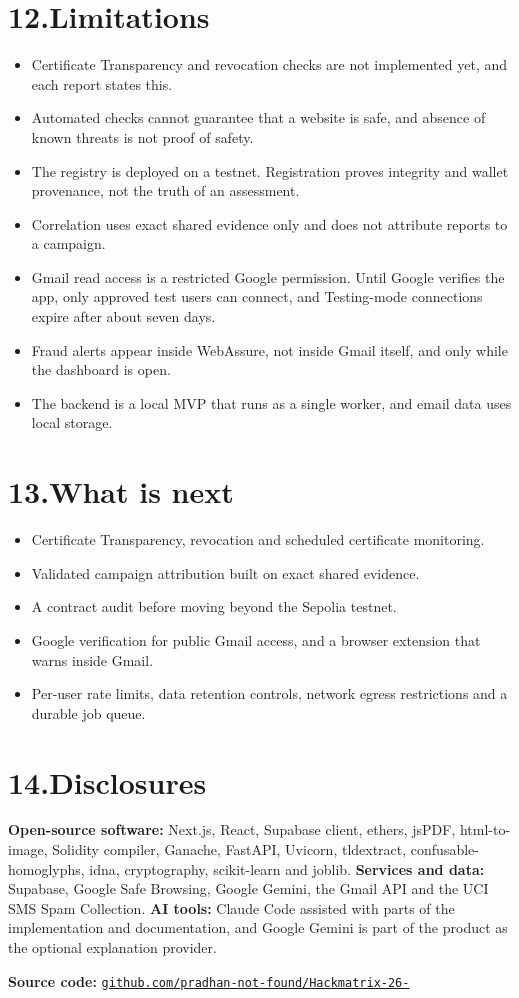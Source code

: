\documentclass[11pt,a4paper]{article}
\begin{document}
\section{12.\quad Limitations}
\begin{itemize}
\item Certificate Transparency and revocation checks are not implemented yet, and each report states this.
\item Automated checks cannot guarantee that a website is safe, and absence of known threats is not proof of safety.
\item The registry is deployed on a testnet. Registration proves integrity and wallet provenance, not the truth of an assessment.
\item Correlation uses exact shared evidence only and does not attribute reports to a campaign.
\item Gmail read access is a restricted Google permission. Until Google verifies the app, only approved test users can connect, and Testing-mode connections expire after about seven days.
\item Fraud alerts appear inside WebAssure, not inside Gmail itself, and only while the dashboard is open.
\item The backend is a local MVP that runs as a single worker, and email data uses local storage.
\end{itemize}
\section{13.\quad What is next}
\begin{itemize}
\item Certificate Transparency, revocation and scheduled certificate monitoring.
\item Validated campaign attribution built on exact shared evidence.
\item A contract audit before moving beyond the Sepolia testnet.
\item Google verification for public Gmail access, and a browser extension that warns inside Gmail.
\item Per-user rate limits, data retention controls, network egress restrictions and a durable job queue.
\end{itemize}
\section{14.\quad Disclosures}
\textbf{Open-source software:} Next.js, React, Supabase client, ethers, jsPDF, html-to-image, Solidity compiler, Ganache, FastAPI, Uvicorn, tldextract, confusable-homoglyphs, idna, cryptography, scikit-learn and joblib. \textbf{Services and data:} Supabase, Google Safe Browsing, Google Gemini, the Gmail API and the UCI SMS Spam Collection. \textbf{AI tools:} Claude Code assisted with parts of the implementation and documentation, and Google Gemini is part of the product as the optional explanation provider.

\textbf{Source code:} \href{https://github.com/pradhan-not-found/Hackmatrix-26-}{\nolinkurl{github.com/pradhan-not-found/Hackmatrix-26-}}
\end{document}

